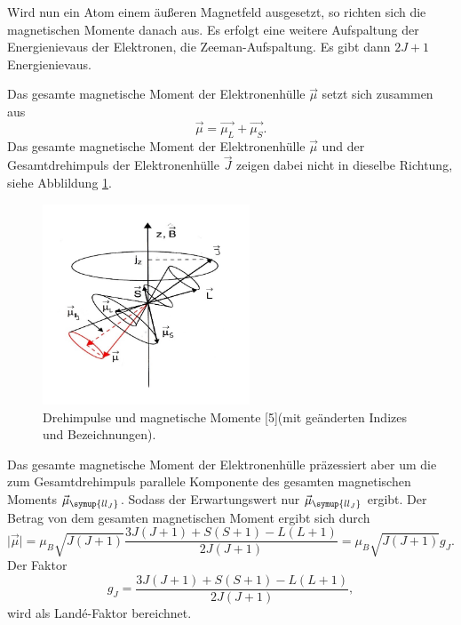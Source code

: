 Wird nun ein Atom einem äußeren Magnetfeld ausgesetzt, so richten sich die magnetischen Momente 
danach aus. Es erfolgt eine weitere Aufspaltung der Energienievaus der Elektronen, die Zeeman-Aufspaltung. 
Es gibt dann $2J+1$ Energienievaus.

Das gesamte magnetische Moment der 
Elektronenhülle $\vec{\mu}$ setzt sich zusammen aus 
\begin{equation*}
     \vec{\mu} =  \vec{\mu_L} + \vec{\mu_S}.
\end{equation*}
Das gesamte magnetische Moment der Elektronenhülle $\vec{\mu}$ und der Gesamtdrehimpuls der 
Elektronenhülle $\vec{J}$ zeigen dabei nicht in dieselbe Richtung, siehe Abblildung \ref{fig:mm}.

\begin{figure}
  \centering
  \includegraphics[width=0.55\textwidth]{mag.mo.jpeg}
  \caption{Drehimpulse und magnetische Momente [5](mit geänderten Indizes und Bezeichnungen).}
  \label{fig:mm}
\end{figure}
\FloatBarrier

Das gesamte magnetische Moment der Elektronenhülle präzessiert aber um die zum Gesamtdrehimpuls parallele 
Komponente des gesamten magnetischen Moments $\vec{\mu}_{\symup{ll_J}}$. Sodass der Erwartungswert nur 
$\vec{\mu}_{\symup{ll_J}}$ ergibt. Der Betrag von dem gesamten magnetischen Moment ergibt sich durch 
\begin{equation*}
    \lvert \vec{\mu} \rvert = \mu_B \sqrt{J (J+1)} \frac{3J(J+1)+ S(S + 1) - L (L+1)}{2 J(J +1)} = \mu_B \sqrt{J (J+1)} g_J.
\end{equation*}
Der Faktor 
\begin{equation}
    g_J = \frac{3J(J+1)+ S(S + 1) - L (L+1)}{2 J(J +1)},
    \label{eqn:gJ}
\end{equation}
wird als Landé-Faktor bereichnet. 

